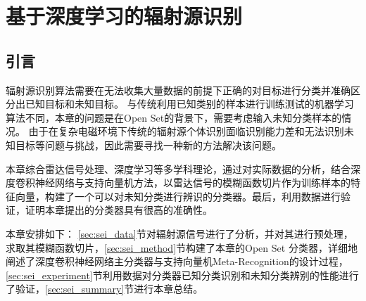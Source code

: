 
\chapter{基于深度学习的辐射源识别}
\label{sec:sei}




\section{引言}
辐射源识别算法需要在无法收集大量数据的前提下正确的对目标进行分类并准确区分出已知目标和未知目标。
与传统利用已知类别的样本进行训练测试的机器学习算法不同，本章的问题是在Open Set的背景下，需要考虑输入未知分类样本的情况。
由于在复杂电磁环境下传统的辐射源个体识别面临识别能力差和无法识别未知目标等问题与挑战，因此需要寻找一种新的方法解决该问题。

本章综合雷达信号处理、深度学习等多学科理论，通过对实际数据的分析，结合深度卷积神经网络与支持向量机方法，以雷达信号的模糊函数切片作为训练样本的特征向量，构建了一个可以对未知分类进行辨识的分类器。最后，利用数据进行验证，证明本章提出的分类器具有很高的准确性。

本章安排如下： \ref{sec:sei_data}节对辐射源信号进行了分析，并对其进行预处理，求取其模糊函数切片，\ref{sec:sei_method}节构建了本章的Open Set 分类器，详细地阐述了深度卷积神经网络主分类器与支持向量机Meta-Recognition的设计过程，\ref{sec:sei_experiment}节利用数据对分类器已知分类识别和未知分类辨别的性能进行了验证，\ref{sec:sei_summary}节进行本章总结。

